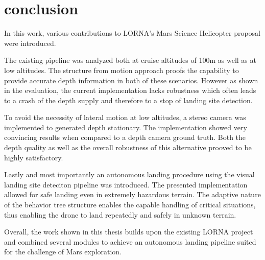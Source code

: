 \chapter{conclusion}
\label{sec:conclusion}

In this work, various contributions to LORNA's Mars Science Helicopter proposal were introduced.

The existing pipeline was analyzed both at cruise altitudes of 100m as well as at low altitudes. The structure from motion approach proofs the capability to provide accurate depth information in both of these scenarios. However as shown in the evaluation, the current implementation lacks robustness which often leads to a crash of the depth supply and therefore to a stop of landing site detection. 

To avoid the necessity of lateral motion at low altitudes, a stereo camera was implemented to generated depth stationary. The implementation showed very convincing results when compared to a depth camera ground truth. Both the depth quality as well as the overall robustness of this alternative prooved to be highly satisfactory.

Lastly and most importantly an autonomous landing procedure using the visual landing site deteciton pipeline was introduced. The presented implementation allowed for safe landing even in extremely hazardous terrain. The adaptive nature of the behavior tree structure enables the capable handling of critical situations, thus enabling the drone to land repeatedly and safely in unknown terrain.

Overall, the work shown in this thesis builds upon the existing LORNA project and combined several modules to achieve an autonomous landing pipeline suited for the challenge of Mars exploration. 